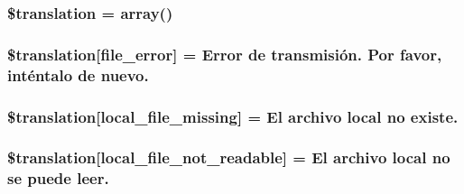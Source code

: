 \subsubsection[{\$translation}]{\setlength{\rightskip}{0pt plus 5cm}\$translation = array()}\label{class_8upload_8es___e_s_8php_a1f198d410fecc3871ebdd468d343a5e3}
\hypertarget{class_8upload_8es___e_s_8php_ac7498e49b9771b04698029aa61c70821}{}
\subsubsection[{\$translation}]{\setlength{\rightskip}{0pt plus 5cm}\$translation\mbox{[}\textquotesingle{}file\+\_\+error\textquotesingle{}\mbox{]} = \textquotesingle{}Error de transmisión. Por favor, inténtalo de nuevo.\textquotesingle{}}\label{class_8upload_8es___e_s_8php_ac7498e49b9771b04698029aa61c70821}
\hypertarget{class_8upload_8es___e_s_8php_a6ec3d3a47ab70d77e7aa593e82ead10e}{}
\subsubsection[{\$translation}]{\setlength{\rightskip}{0pt plus 5cm}\$translation\mbox{[}\textquotesingle{}local\+\_\+file\+\_\+missing\textquotesingle{}\mbox{]} = \textquotesingle{}El archivo local no existe.\textquotesingle{}}\label{class_8upload_8es___e_s_8php_a6ec3d3a47ab70d77e7aa593e82ead10e}
\hypertarget{class_8upload_8es___e_s_8php_a60104befef9b241f3a7a6a755618a4b3}{}
\subsubsection[{\$translation}]{\setlength{\rightskip}{0pt plus 5cm}\$translation\mbox{[}\textquotesingle{}local\+\_\+file\+\_\+not\+\_\+readable\textquotesingle{}\mbox{]} = \textquotesingle{}El archivo local no se puede leer.\textquotesingle{}}\label{class_8upload_8es___e_s_8php_a60104befef9b241f3a7a6a755618a4b3}
\hypertarget{class_8upload_8es___e_s_8php_a6a08dcd0d3651fdd098568f6b2f0a42c}{}
